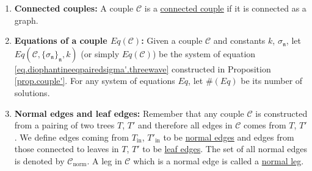 \begin{defn}\label{def.morecouple}
\begin{enumerate}
    \item \textbf{Connected couples:} A couple $\mathcal{C}$ is a \underline{connected couple} if it is connected as a graph.  
    \item \textbf{Equations of a couple $Eq(\mathcal{C})$:} Given a couple $\mathcal{C}$ and constants $k$, $\sigma_{\mathfrak{n}}$, let $Eq(\mathcal{C},\{\sigma_{\mathfrak{n}}\}_{\mathfrak{n}}, k)$ (or simply $Eq(\mathcal{C})$) be the system of equation \eqref{eq.diophantineeqpairedsigma'.threewave} constructed in Proposition \ref{prop.couple'}. For any system of equations $Eq$, let $\#(Eq)$ be its number of solutions.
    \item \textbf{Normal edges and leaf edges:} Remember that any couple $\mathcal{C}$ is constructed from a pairing of two trees $T$, $T'$ and therefore all edges in $\mathcal{C}$ comes from $T$, $T'$. We define edges coming from $T_{\text{in}}$, $T'_{\text{in}}$ to be \underline{normal edges} and edges from those connected to leaves in $T$, $T'$ to be \underline{leaf edges}. The set of all normal edges is denoted by $\mathcal{C}_{\text{norm}}$. A leg in $\mathcal{C}$ which is a normal edge is called a \underline{normal leg}.
\end{enumerate}
\end{defn}

